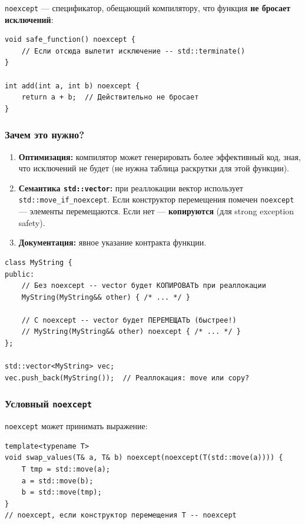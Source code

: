 \documentclass[a4paper,12pt]{article}
\begin{document}
\texttt{noexcept} --- спецификатор, обещающий компилятору, что функция
\textbf{не бросает исключений}:

\begin{lstlisting}
void safe_function() noexcept {
    // Если отсюда вылетит исключение -- std::terminate()
}

int add(int a, int b) noexcept {
    return a + b;  // Действительно не бросает
}
\end{lstlisting}

\subsubsection{Зачем это нужно?}

\begin{enumerate}
    \item \textbf{Оптимизация:} компилятор может генерировать более
          эффективный код, зная, что исключений не будет (не нужна таблица
          раскрутки для этой функции).
    \item \textbf{Семантика \texttt{std::vector}:} при реаллокации вектор
          использует \texttt{std::move\_if\_noexcept}. Если конструктор перемещения
          помечен \texttt{noexcept} --- элементы перемещаются. Если нет ---
          \textbf{копируются} (для strong exception safety).
    \item \textbf{Документация:} явное указание контракта функции.
\end{enumerate}

\begin{lstlisting}
class MyString {
public:
    // Без noexcept -- vector будет КОПИРОВАТЬ при реаллокации
    MyString(MyString&& other) { /* ... */ }

    // С noexcept -- vector будет ПЕРЕМЕЩАТЬ (быстрее!)
    // MyString(MyString&& other) noexcept { /* ... */ }
};

std::vector<MyString> vec;
vec.push_back(MyString());  // Реаллокация: move или copy?
\end{lstlisting}

\subsubsection{Условный \texttt{noexcept}}

\texttt{noexcept} может принимать выражение:

\begin{lstlisting}
template<typename T>
void swap_values(T& a, T& b) noexcept(noexcept(T(std::move(a)))) {
    T tmp = std::move(a);
    a = std::move(b);
    b = std::move(tmp);
}
// noexcept, если конструктор перемещения T -- noexcept
\end{lstlisting}
\end{document}

